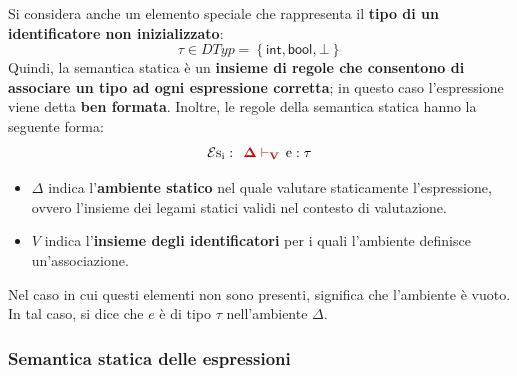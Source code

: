 \documentclass[a4paper]{article}
\begin{document}
	\noindent
	Si considera anche un elemento speciale che rappresenta il \textbf{tipo di un identificatore non inizializzato}:
	\begin{equation*}
		\tau \in DTyp = \left\{\textsf{int}, \textsf{bool}, \bot\right\}
	\end{equation*}
	Quindi, la semantica statica è un \textbf{insieme di regole che consentono di associare un tipo ad ogni espressione corretta}; in questo caso l'espressione viene detta \textcolor{Red3}{\textbf{ben formata}}. Inoltre, le regole della semantica statica hanno la seguente forma:\label{ben formata}
	\begin{equation*}
		\mathcal{E} \mathrm{s_{i}} : \:\: \textcolor{Red3}{\mathbf{\Delta \vdash_{V}}} \:\: \mathrm{e} : \tau
	\end{equation*}
	
	\noindent
	\begin{itemize}
		\item $\Delta$ indica l'\textbf{ambiente statico} nel quale valutare staticamente l'espressione, ovvero l'insieme dei legami statici validi nel contesto di valutazione.
		
		\item $V$ indica l'\textbf{insieme degli identificatori} per i quali l'ambiente definisce un'associazione.
	\end{itemize}
	Nel caso in cui questi elementi non sono presenti, significa che l'ambiente è vuoto. In tal caso, si dice che $e$ è di tipo $\tau$ nell'ambiente $\Delta$.\newpage

	\subsubsection{Semantica statica delle espressioni}\label{semantica statica delle espressioni}
	
\end{document}
